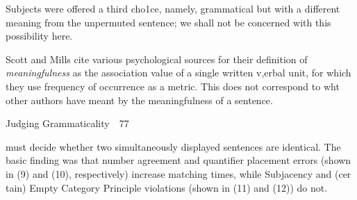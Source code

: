 \begin{listWWNumlvleveli}
\item 
\setcounter{listWWNumlvlevelii}{1}
\begin{listWWNumlvlevelii}
\item 
\setcounter{listWWNumlvleveliii}{0}
\begin{listWWNumlvleveliii}
\item 
\begin{styleStandard}
Subjects were offered a third cho1ce, namely, {\textquotedbl}grammatical but with a different meaning from the unpermuted sentence{\textquotedbl}; we shall not be concerned with this possibility here.
\end{styleStandard}


\item 
\begin{styleStandard}
Scott and Mills cite various psychological sources for their definition of \textit{meaningfulness}\textit{ }as {\textquotedbl}the association value of a single written v,erbal unit,{\textquotedbl} for which they use frequency of occurrence as a metric. This does not correspond to wht other authors have meant by the meaningfulness of a sentence.
\end{styleStandard}


\end{listWWNumlvleveliii}
\end{listWWNumlvlevelii}
\end{listWWNumlvleveli}
\clearpage\setcounter{page}{1}\begin{styleStandard}
Judging Grammaticality\ \ 77
\end{styleStandard}


\begin{styleTextbody}
must decide whether two simultaneously displayed sentences are identical. The basic finding was that number agreement and quantifier placement errors (shown in (9) and (10), respectively) increase matching times, while Subjacency and (cer\- tain) Empty Category Principle violations (shown in (11) and (12)) do not.
\end{styleTextbody}


